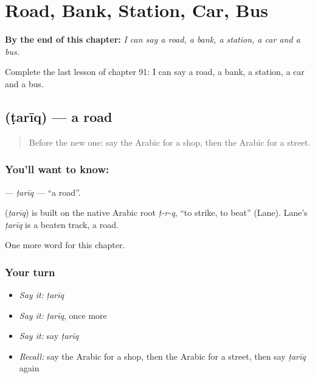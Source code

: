 
\chapter{Road, Bank, Station, Car, Bus}
\label{ch:ar-road-bank-station-car-bus}

\begin{chapteropening}
\textbf{By the end of this chapter:} \emph{I can say a road, a bank, a station, a car and a bus.}

Complete the last lesson of chapter 91: I can say a road, a bank, a station, a car and a bus.
\end{chapteropening}

\section[\texorpdfstring{\ar{طريق} (ṭarīq)}{طريق (ṭarīq)}]{ (ṭarīq) — a road}

\label{lesson:AR-C91-tariq}



\begin{quote}
Before the new one: say the Arabic for a shop, then the Arabic for a street.
\end{quote}

\subsection*{You'll want to know: }
\textbf{} — \emph{ṭarīq} — \textquotedblleft{}a road\textquotedblright{}.

\begin{cousinweb}
\textbf{} (\emph{ṭarīq}) is built on the native Arabic root \emph{ṭ-r-q}, \textquotedblleft{}to strike, to beat\textquotedblright{} (Lane). Lane's \emph{ṭarīq} is a beaten track, a road.
\end{cousinweb}

\begin{grammarlens}[title={What you've built}]
One more word for this chapter.
\end{grammarlens}

\subsection*{Your turn}
\begin{itemize}
\raggedright
  \item \emph{Say it:} \emph{ṭarīq}
  \item \emph{Say it:} \emph{ṭarīq}, once more
  \item \emph{Say it:} say \emph{ṭarīq}
  \item \emph{Recall:} say the Arabic for a shop, then the Arabic for a street, then say \emph{ṭarīq} again
\end{itemize}

